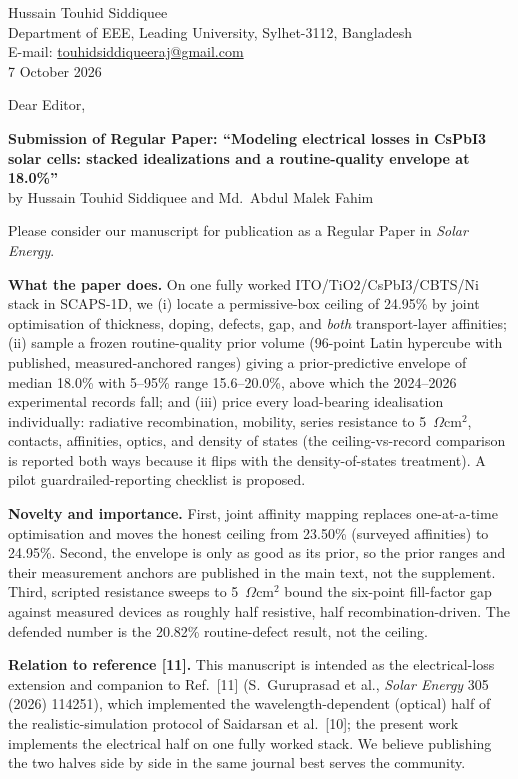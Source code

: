 \documentclass[11pt,a4paper]{article}
\begin{document}
\begin{flushright}
Hussain Touhid Siddiquee\\
Department of EEE, Leading University, Sylhet-3112, Bangladesh\\
E-mail: \url{touhidsiddiqueeraj@gmail.com}\\
7 October 2026
\end{flushright}

\vspace{1em}
\noindent Dear Editor,

\vspace{1em}
\noindent\textbf{Submission of Regular Paper: ``Modeling electrical losses in CsPbI3 solar cells: stacked idealizations and a routine-quality envelope at 18.0\%''}\\
by Hussain Touhid Siddiquee and Md.\ Abdul Malek Fahim

\vspace{1em}
Please consider our manuscript for publication as a Regular Paper in \textit{Solar Energy}.

\textbf{What the paper does.} On one fully worked ITO/TiO2/CsPbI3/CBTS/Ni stack in SCAPS-1D, we (i) locate a permissive-box ceiling of 24.95\% by joint optimisation of thickness, doping, defects, gap, and \textit{both} transport-layer affinities; (ii) sample a frozen routine-quality prior volume (96-point Latin hypercube with published, measured-anchored ranges) giving a prior-predictive envelope of median 18.0\% with 5--95\% range 15.6--20.0\%, above which the 2024--2026 experimental records fall; and (iii) price every load-bearing idealisation individually: radiative recombination, mobility, series resistance to 5~$\Omega$cm$^2$, contacts, affinities, optics, and density of states (the ceiling-vs-record comparison is reported both ways because it flips with the density-of-states treatment). A pilot guardrailed-reporting checklist is proposed.

\textbf{Novelty and importance.} First, joint affinity mapping replaces one-at-a-time optimisation and moves the honest ceiling from 23.50\% (surveyed affinities) to 24.95\%. Second, the envelope is only as good as its prior, so the prior ranges and their measurement anchors are published in the main text, not the supplement. Third, scripted resistance sweeps to 5~$\Omega$cm$^2$ bound the six-point fill-factor gap against measured devices as roughly half resistive, half recombination-driven. The defended number is the 20.82\% routine-defect result, not the ceiling.

\textbf{Relation to reference [11].} This manuscript is intended as the electrical-loss extension and companion to Ref.~[11] (S.~Guruprasad et al., \textit{Solar Energy} 305 (2026) 114251), which implemented the wavelength-dependent (optical) half of the realistic-simulation protocol of Saidarsan et al.~[10]; the present work implements the electrical half on one fully worked stack. We believe publishing the two halves side by side in the same journal best serves the community.
\end{document}
